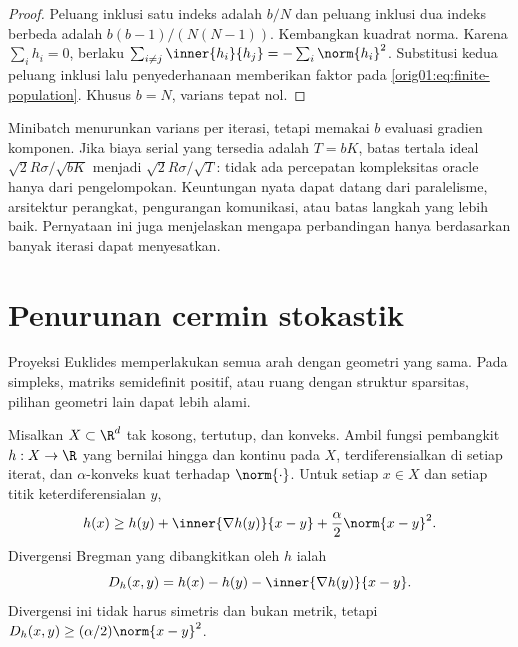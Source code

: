 \begin{proof}
  Peluang inklusi satu indeks adalah $b/N$ dan peluang inklusi dua indeks
  berbeda adalah $b(b-1)/(N(N-1))$. Kembangkan kuadrat norma. Karena
  $\sum_i h_i=0$, berlaku
  $\sum_{i\ne j}\inner{h_i}{h_j}=-\sum_i\norm{h_i}^2$. Substitusi kedua
  peluang inklusi lalu penyederhanaan memberikan faktor pada
  \eqref{orig01:eq:finite-population}. Khusus $b=N$, varians tepat nol.
\end{proof}

Minibatch menurunkan varians per iterasi, tetapi memakai $b$ evaluasi gradien
komponen. Jika biaya serial yang tersedia adalah $T=bK$, batas tertala ideal
$\sqrt2R\sigma/\sqrt{bK}$ menjadi $\sqrt2R\sigma/\sqrt T$: tidak ada
percepatan kompleksitas oracle hanya dari pengelompokan. Keuntungan nyata
dapat datang dari paralelisme, arsitektur perangkat, pengurangan komunikasi,
atau batas langkah yang lebih baik. Pernyataan ini juga menjelaskan mengapa
perbandingan hanya berdasarkan banyak iterasi dapat menyesatkan.

\section{Penurunan cermin stokastik}
\label{orig01:section:mirror}

Proyeksi Euklides memperlakukan semua arah dengan geometri yang sama. Pada
simpleks, matriks semidefinit positif, atau ruang dengan struktur sparsitas,
pilihan geometri lain dapat lebih alami.

Misalkan $X\subset\R^d$ tak kosong, tertutup, dan konveks. Ambil fungsi
pembangkit $h:X\to\R$ yang bernilai hingga dan kontinu pada $X$,
terdiferensialkan di setiap iterat, dan $\alpha$-konveks kuat terhadap
$\norm{\cdot}$. Untuk setiap $x\in X$ dan setiap titik keterdiferensialan $y$,
\begin{equation}
    h(x)\geq h(y)+\inner{\nabla h(y)}{x-y}
  +\frac\alpha2\norm{x-y}^2.
\end{equation}
Divergensi Bregman yang dibangkitkan oleh $h$ ialah
\begin{equation}
  \label{orig01:eq:bregman}
  D_h(x,y)=h(x)-h(y)-\inner{\nabla h(y)}{x-y}.
\end{equation}
Divergensi ini tidak harus simetris dan bukan metrik, tetapi
$D_h(x,y)\geq(\alpha/2)\norm{x-y}^2$.

